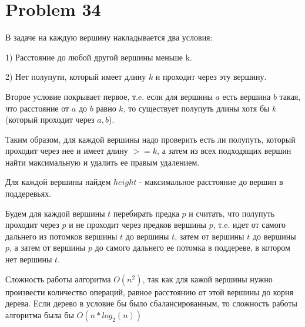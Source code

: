 \documentclass[a4paper,12pt]{article}
\begin{document}
\section{Problem 34}

В задаче на каждую вершину накладывается два условия:

1) Расстояние до любой другой вершины меньше k.

2) Нет полупути, который имеет длину $k$ и проходит через эту вершину.

Второе условие покрывает первое, т.e. если для вершины $a$ есть вершина $b$ такая, что расстояние от $a$ до $b$ равно $k$, то существует полупуть длины хотя бы $k$ (который проходит через $a, b$).

Таким образом, для каждой вершины надо проверить есть ли полупуть, который проходит через нее и имеет длину $>=k$, а затем из всех подходящих вершин найти максимальную и удалить ее правым удалением.

Для каждой вершины найдем $height$ - максимальное расстояние до вершин в поддеревьях.

Будем для каждой вершины $t$ перебирать предка $p$ и считать, что полупуть проходит через $p$ и не проходит через предков вершины $p$, т.e. идет от самого дальнего из потомков вершины $t$ до вершины $t$, затем от вершины $t$ до вершины $p$, а затем от вершины $p$ до самого дальнего ее потомка в поддереве, в котором нет вершины $t$.

Сложность работы алгоритма $O(n^2)$, так как для кажой вершины нужно произвести количество операций, равное расстоянию от этой вершины до корня дерева. Если дерево в условие бы было сбалансированным, то сложность работы алгоритма была бы $O(n*log_2(n))$
\end{document}
